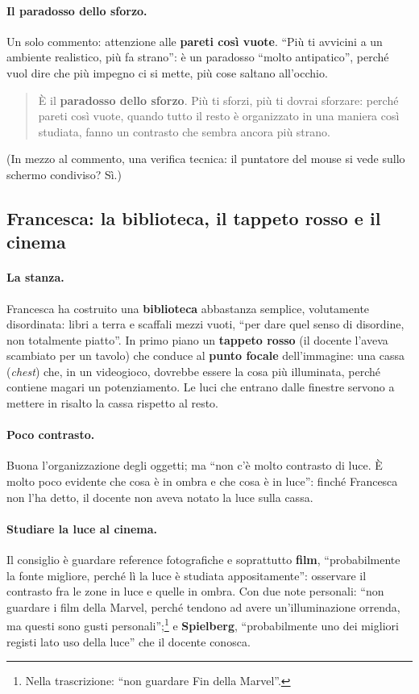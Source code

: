 \paragraph{Il paradosso dello sforzo.} Un solo commento: attenzione alle \textbf{pareti
così vuote}. ``Più ti avvicini a un ambiente realistico, più fa strano'': è un paradosso
``molto antipatico'', perché vuol dire che più impegno ci si mette, più cose saltano
all'occhio.
\begin{quote}
È il \textbf{paradosso dello sforzo}. Più ti sforzi, più ti dovrai sforzare: perché
pareti così vuote, quando tutto il resto è organizzato in una maniera così studiata,
fanno un contrasto che sembra ancora più strano.
\end{quote}
(In mezzo al commento, una verifica tecnica: il puntatore del mouse si vede sullo
schermo condiviso? Sì.)

\subsection{Francesca: la biblioteca, il tappeto rosso e il cinema}

\paragraph{La stanza.} Francesca ha costruito una \textbf{biblioteca} abbastanza
semplice, volutamente disordinata: libri a terra e scaffali mezzi vuoti, ``per dare
quel senso di disordine, non totalmente piatto''. In primo piano un \textbf{tappeto
rosso} (il docente l'aveva scambiato per un tavolo) che conduce al \textbf{punto focale}
dell'immagine: una cassa (\emph{chest}) che, in un videogioco, dovrebbe essere la cosa
più illuminata, perché contiene magari un potenziamento. Le luci che entrano dalle
finestre servono a mettere in risalto la cassa rispetto al resto.

\paragraph{Poco contrasto.} Buona l'organizzazione degli oggetti; ma ``non c'è molto
contrasto di luce. È molto poco evidente che cosa è in ombra e che cosa è in luce'':
finché Francesca non l'ha detto, il docente non aveva notato la luce sulla cassa.

\paragraph{Studiare la luce al cinema.} Il consiglio è guardare reference fotografiche
e soprattutto \textbf{film}, ``probabilmente la fonte migliore, perché lì la luce è
studiata appositamente'': osservare il contrasto fra le zone in luce e quelle in ombra.
Con due note personali: ``non guardare i film della Marvel, perché tendono ad avere
un'illuminazione orrenda, ma questi sono gusti personali'';\footnote{Nella trascrizione:
``non guardare Fin della Marvel''.} e \textbf{Spielberg}, ``probabilmente uno dei
migliori registi lato uso della luce'' che il docente conosca.

